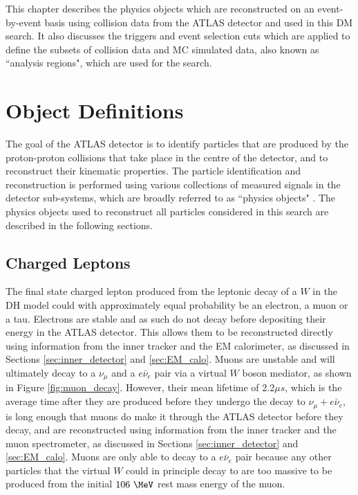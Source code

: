 \label{chapter:objects}

This chapter describes the physics objects which are reconstructed on an event-by-event basis using collision data from the ATLAS detector and used in this DM search. It also discusses the triggers and event selection cuts which are applied to define the subsets of collision data and MC simulated data, also known as ``analysis regions", which are used for the search. 

\section{Object Definitions}
\label{ap:object_defs}

The goal of the ATLAS detector is to identify particles that are produced by the proton-proton collisions that take place in the centre of the detector, and to reconstruct their kinematic properties. The particle identification and reconstruction is performed using various collections of measured signals in the detector sub-systems, which are broadly referred to as ``physics objects" \cite{physics_objects_atlas_2013}. The physics objects used to reconstruct all particles considered in this search are described in the following sections.

\subsection{Charged Leptons}

The final state charged lepton produced from the leptonic decay of a \(W\) in the DH model could with approximately equal probability be an electron, a muon or a tau. Electrons are stable and as such do not decay before depositing their energy in the ATLAS detector. This allows them to be reconstructed directly using information from the inner tracker and the EM calorimeter, as discussed in Sections \ref{sec:inner_detector} and \ref{sec:EM_calo}. Muons are unstable and will ultimately decay to a \(\nu_\mu\) and a \(e\bar{\nu}_e\) pair via a virtual \(W\) boson mediator, as shown in Figure \ref{fig:muon_decay}. However, their mean lifetime of 2.2\(\mu s\), which is the average time after they are produced before they undergo the decay to \(\nu_\mu+e\bar{\nu}_e\), is long enough that muons do make it through the ATLAS detector before they decay, and are reconstructed using information from the inner tracker and the muon spectrometer, as discussed in Sections \ref{sec:inner_detector} and \ref{sec:EM_calo}. Muons are only able to decay to a \(e\bar{\nu}_e\) pair because any other particles that the virtual \(W\) could in principle decay to are too massive to be produced from the initial \(106~\MeV\) rest mass energy of the muon. 

